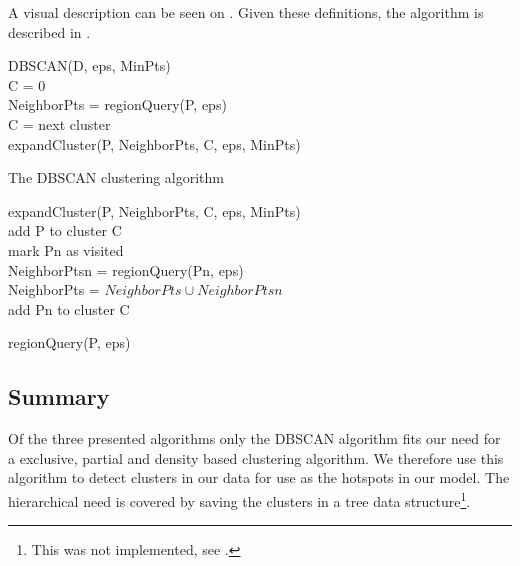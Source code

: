 A visual description can be seen on .
Given these definitions, the algorithm is described in .

\begin{algorithm}
DBSCAN(D, eps, MinPts)\\
	C = 0\\
	{
		NeighborPts = regionQuery(P, eps)\\
		{
			C = next cluster\\
			expandCluster(P, NeighborPts, C, eps, MinPts)
		}
	}
\caption{The DBSCAN clustering algorithm}\label{dbscan-algo}
\end{algorithm}

\begin{algorithm}
expandCluster(P, NeighborPts, C, eps, MinPts)\\
	add P to cluster C\\
	{
		{
			mark Pn as visited\\
			NeighborPtsn = regionQuery(Pn, eps)\\
		}
		{
			NeighborPts = $ NeighborPts \cup NeighborPtsn $\\
			{add Pn to cluster C\\}
		}
	}
\end{algorithm}%

\begin{algorithm}
regionQuery(P, eps)\\
\end{algorithm}

\subsection{Summary} Of the three presented algorithms only the DBSCAN algorithm fits our need for a exclusive, partial and density based clustering algorithm.
We therefore use this algorithm to detect clusters in our data for use as the hotspots in our model.
The hierarchical need is covered by saving the clusters in a tree data structure\footnote{This was not implemented, see .}.